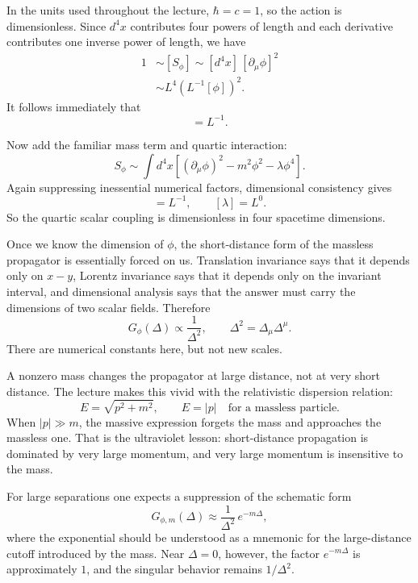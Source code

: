 In the units used throughout the lecture, \(\hbar=c=1\), so the action is dimensionless. Since \(d^4x\) contributes four powers of length and each derivative contributes one inverse power of length, we have
\begin{align}
1 &\sim [S_\phi] \sim [d^4x]\,[\partial_\mu \phi]^2 \\
  &\sim L^4 \left(L^{-1}[\phi]\right)^2.
\end{align}
It follows immediately that
\begin{equation}
[\phi] = L^{-1}.
\end{equation}

Now add the familiar mass term and quartic interaction:
\begin{equation}
S_\phi \sim \int d^4x \left[(\partial_\mu\phi)^2 - m^2\phi^2 - \lambda \phi^4\right].
\end{equation}
Again suppressing inessential numerical factors, dimensional consistency gives
\begin{equation}
[m]=L^{-1}, \qquad [\lambda]=L^0.
\end{equation}
So the quartic scalar coupling is dimensionless in four spacetime dimensions.

Once we know the dimension of \(\phi\), the short-distance form of the massless propagator is essentially forced on us. Translation invariance says that it depends only on \(x-y\), Lorentz invariance says that it depends only on the invariant interval, and dimensional analysis says that the answer must carry the dimensions of two scalar fields. Therefore
\begin{equation}
G_\phi(\Delta) \propto \frac{1}{\Delta^2},
\qquad
\Delta^2 = \Delta_\mu \Delta^\mu.
\end{equation}
There are numerical constants here, but not new scales.

A nonzero mass changes the propagator at large distance, not at very short distance. The lecture makes this vivid with the relativistic dispersion relation:
\begin{equation}
E=\sqrt{p^2+m^2},
\qquad
E=|p|
\quad \text{for a massless particle.}
\end{equation}
When \(|p|\gg m\), the massive expression forgets the mass and approaches the massless one. That is the ultraviolet lesson: short-distance propagation is dominated by very large momentum, and very large momentum is insensitive to the mass.

For large separations one expects a suppression of the schematic form
\begin{equation}
G_{\phi,m}(\Delta) \approx \frac{1}{\Delta^2}\, e^{-m\Delta},
\end{equation}
where the exponential should be understood as a mnemonic for the large-distance cutoff introduced by the mass. Near \(\Delta=0\), however, the factor \(e^{-m\Delta}\) is approximately \(1\), and the singular behavior remains \(1/\Delta^2\).


